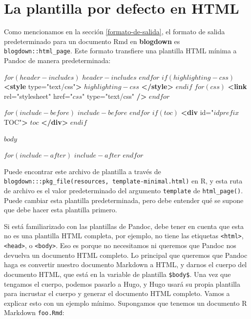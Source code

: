 \documentclass[12pt,]{krantz}
\makeatletter
\newenvironment{Shaded}{\begin{snugshade}}{\end{snugshade}}
\newcommand{\KeywordTok}[1]{\textcolor[rgb]{0.13,0.29,0.53}{\textbf{#1}}}
\newcommand{\NormalTok}[1]{#1}
\newcommand{\OtherTok}[1]{\textcolor[rgb]{0.56,0.35,0.01}{#1}}
\newcommand{\StringTok}[1]{\textcolor[rgb]{0.31,0.60,0.02}{#1}}
\newenvironment{kframe}{%
\medskip{}
\setlength{\fboxsep}{.8em}
 \def\at@end@of@kframe{}%
 \ifinner\ifhmode%
  \def\at@end@of@kframe{\end{minipage}}%
  \begin{minipage}{\columnwidth}%
 \fi\fi%
 \def\FrameCommand##1{\hskip\@totalleftmargin \hskip-\fboxsep
 \colorbox{shadecolor}{##1}\hskip-\fboxsep
     \hskip-\linewidth \hskip-\@totalleftmargin \hskip\columnwidth}%
 \MakeFramed {\advance\hsize-\width
   \@totalleftmargin\z@ \linewidth\hsize
   \@setminipage}}%
 {\par\unskip\endMakeFramed%
 \at@end@of@kframe}
\renewenvironment{Shaded}{\begin{kframe}}{\end{kframe}}
\theoremstyle{definition}
\theoremstyle{definition}
\theoremstyle{definition}
\theoremstyle{remark}
\makeatother
\begin{document}
\hypertarget{default-plantilla}{%
\section{La plantilla por defecto en HTML}\label{default-plantilla}}

Como mencionamos en la sección \ref{formato-de-salida}, el formato de
salida predeterminado para un documento Rmd en \textbf{blogdown} es
\texttt{blogdown::html\_page}. Este formato transfiere una plantilla
HTML mínima a Pandoc de manera predeterminada:

\begin{Shaded}
\begin{Highlighting}[]
\NormalTok{$for(header-includes)$}
\NormalTok{$header-includes$}
\NormalTok{$endfor$}
\NormalTok{$if(highlighting-css)$}
\KeywordTok{<style}\OtherTok{ type=}\StringTok{"text/css"}\KeywordTok{>}
\NormalTok{$highlighting-css$}
\KeywordTok{</style>}
\NormalTok{$endif$}
\NormalTok{$for(css)$}
  \KeywordTok{<link}\OtherTok{ rel=}\StringTok{"stylesheet"}\OtherTok{ href=}\StringTok{"$css$"}\OtherTok{ type=}\StringTok{"text/css"} \KeywordTok{/>}
\NormalTok{$endfor$}

\NormalTok{$for(include-before)$}
\NormalTok{$include-before$}
\NormalTok{$endfor$}
\NormalTok{$if(toc)$}
\KeywordTok{<div}\OtherTok{ id=}\StringTok{"$idprefix$TOC"}\KeywordTok{>}
\NormalTok{$toc$}
\KeywordTok{</div>}
\NormalTok{$endif$}

\NormalTok{$body$}

\NormalTok{$for(include-after)$}
\NormalTok{$include-after$}
\NormalTok{$endfor$}
\end{Highlighting}
\end{Shaded}

Puede encontrar este archivo de plantilla a través de
\texttt{blogdown:::pkg\_file(\textquotesingle{}resources\textquotesingle{},\ \textquotesingle{}template-minimal.html\textquotesingle{})}
en R, y esta ruta de archivo es el valor predeterminado del argumento
\texttt{template} de \texttt{html\_page()}. Puede cambiar esta plantilla
predeterminada, pero debe entender qué se supone que debe hacer esta
plantilla primero.

Si está familiarizado con las plantillas de Pandoc, debe tener en cuenta
que esta no es una plantilla HTML completa, por ejemplo, no tiene las
etiquetas \texttt{\textless{}html\textgreater{}},
\texttt{\textless{}head\textgreater{}}, o
\texttt{\textless{}body\textgreater{}}. Eso es porque no necesitamos ni
queremos que Pandoc nos devuelva un documento HTML completo. Lo
principal que queremos que Pandoc haga es convertir nuestro documento
Markdown a HTML, y darnos el cuerpo del documento HTML, que está en la
variable de plantilla \texttt{\$body\$}. Una vez que tengamos el cuerpo,
podemos pasarlo a Hugo, y Hugo usará su propia plantilla para incrustar
el cuerpo y generar el documento HTML completo. Vamos a explicar esto
con un ejemplo mínimo. Supongamos que tenemos un documento R Markdown
\texttt{foo.Rmd}:
\end{document}
